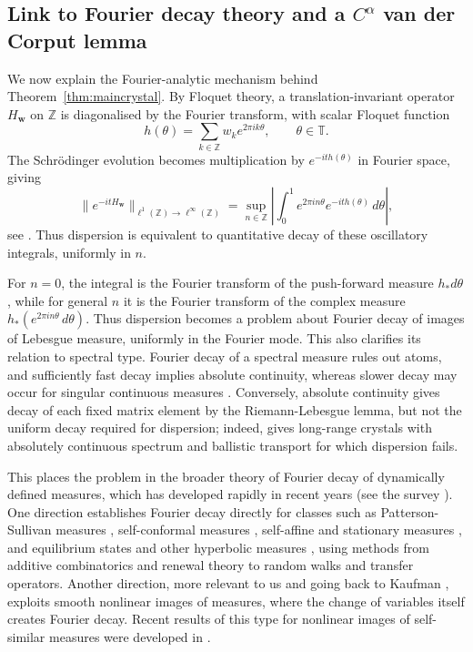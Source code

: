 \documentclass[11pt]{amsart}
\theoremstyle{plain}
\theoremstyle{definition}
\numberwithin{equation}{section}
\begin{document}
\subsection{Link to Fourier decay theory and a $C^\alpha$ van der Corput lemma}
We now explain the Fourier-analytic mechanism behind Theorem~\ref{thm:maincrystal}. By Floquet theory, a translation-invariant operator $H_{\mathbf w}$ on $\mathbb Z$ is diagonalised by the Fourier transform, with scalar Floquet function
$$
h(\theta)=\sum_{k\in\mathbb Z}w_ke^{2\pi ik\theta},\qquad \theta\in\mathbb T.
$$
The Schr\"odinger evolution becomes multiplication by $e^{-ith(\theta)}$ in Fourier space, giving
\begin{equation}\label{eq:osc-int-intro}
\|e^{-itH_{\mathbf w}}\|_{\ell^1(\mathbb Z)\to\ell^\infty(\mathbb Z)}
=
\sup_{n\in\mathbb Z}
\left|
\int_0^1 e^{2\pi in\theta}e^{-ith(\theta)}\,d\theta
\right|,
\end{equation}
see \cite[Section~2.2]{KernerPostSabriTaufer}. Thus dispersion is equivalent to quantitative decay of these oscillatory integrals, uniformly in $n$.

For $n=0$, the integral is the Fourier transform of the push-forward measure $h_*d\theta$, while for general $n$ it is the Fourier transform of the complex measure $h_*(e^{2\pi in\theta}\,d\theta)$. Thus dispersion becomes a problem about Fourier decay of images of Lebesgue measure, uniformly in the Fourier mode. This also clarifies its relation to spectral type. Fourier decay of a spectral measure rules out atoms, and sufficiently fast decay implies absolute continuity, whereas slower decay may occur for singular continuous measures \cite{SiSC7}. Conversely, absolute continuity gives decay of each fixed matrix element by the Riemann-Lebesgue lemma, but not the uniform decay required for dispersion; indeed, \cite{KernerPostSabriTaufer} gives long-range crystals with absolutely continuous spectrum and ballistic transport for which dispersion fails.

This places the problem in the broader theory of Fourier decay of dynamically defined measures, which has developed rapidly in recent years (see the survey \cite{Sahlsten}). One direction establishes Fourier decay directly for classes such as Patterson-Sullivan measures \cite{BD,BakerKhalilSahlsten,LequenSahlsten}, self-conformal measures \cite{AlgomHertzWang,AlgomHertzWangLog,BakerSahlsten,BakerKhalilSahlsten,JordanSahlsten,KaufmanCF,QueffelecRamare,SahlstenStevens}, self-affine and stationary measures \cite{Li,LiENS,LiSahlstenAffine,LiSahlsten,LindenstraussVarju,Rapaport}, and equilibrium states and other hyperbolic measures \cite{LeclercBunched,LeclercHyperbolic,LeclercJulia,BakerKhalilSahlsten}, using methods from additive combinatorics and renewal theory to random walks and transfer operators. Another direction, more relevant to us and going back to Kaufman \cite{Kaufman}, exploits smooth nonlinear images of measures, where the change of variables itself creates Fourier decay. Recent results of this type for nonlinear images of self-similar measures were developed in \cite{MosqueraShmerkin,ACWW,BakerBanaji,BanajiYu,BanajiYu2,AlgomBenOvadiaHertzShannon}.
\end{document}

